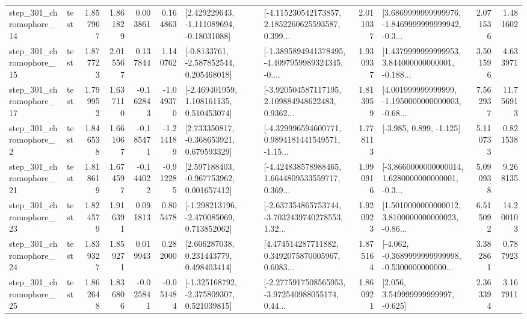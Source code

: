 \begin{tabular}{llrrrrllrlrr}
  step\_301\_chromophore\_14 &      test &      1.857967 &    1.861829 &      0.003861 &  0.164863 &    [2.429229643, -1.111089694, -0.18031088] &  [-4.115230542173857, 2.1852260625593587, 0.399... &       2.011037 &  [3.6869999999999976, -1.8469999999999942, -0.3... &            2.071536 &          1.481602 \\
  step\_301\_chromophore\_15 &      test &      1.877723 &    2.015567 &      0.137844 &  1.140762 &     [-0.8133761, -2.587852544, 0.205468018] &  [-1.3895894941378495, -4.4097959989324345, -0.... &       1.930937 &  [1.4379999999999953, 3.844000000000001, -0.188... &            3.501596 &          4.633971 \\
  step\_301\_chromophore\_17 &      test &      1.799952 &    1.637110 &     -0.162843 & -1.049370 &    [-2.469401959, 1.108161135, 0.510453074] &  [-3.920504587117195, 2.109884948622483, 0.9362... &       1.813959 &  [4.001999999999999, -1.1950000000000003, -0.68... &            7.562937 &         11.756913 \\
   step\_301\_chromophore\_2 &      test &      1.846538 &    1.661067 &     -0.185471 & -1.214189 &    [2.733350817, -0.368653921, 0.679593329] &  [-4.329996594600771, 0.9894181441549571, -1.15... &       1.778113 &                            [-3.985, 0.899, -1.125] &            5.110733 &          0.821538 \\
  step\_301\_chromophore\_21 &      test &      1.818619 &    1.674597 &     -0.144022 & -0.912285 &    [2.597188403, -0.967753962, 0.001657412] &  [-4.424838578988465, 1.6644809533559717, 0.369... &       1.990916 &  [-3.8660000000000014, 1.6280000000000001, -0.3... &            5.090938 &          9.268135 \\
  step\_301\_chromophore\_23 &      test &      1.824579 &    1.916391 &      0.091813 &  0.805478 &   [-1.298213196, -2.470085069, 0.713852062] &  [-2.637354865753744, -3.7032439740278553, 1.32... &       1.920923 &  [1.5010000000000012, 3.8100000000000023, -0.86... &            6.515092 &         14.200103 \\
  step\_301\_chromophore\_24 &      test &      1.839327 &    1.859271 &      0.019943 &  0.282000 &     [2.606287038, 0.231443779, 0.498403414] &  [4.474514287711882, 0.3492075870005967, 0.6083... &       1.875164 &  [-4.062, -0.3689999999999998, -0.5300000000000... &            3.382861 &          0.787923 \\
  step\_301\_chromophore\_25 &      test &      1.862648 &    1.836806 &     -0.025841 & -0.051484 &   [-1.325168792, -2.375809307, 0.521039815] &  [-2.2775917508565953, -3.972540988055174, 0.44... &       1.860921 &                 [2.056, 3.549999999999997, -0.625] &            2.363394 &          3.167911 \\

\end{tabular}
